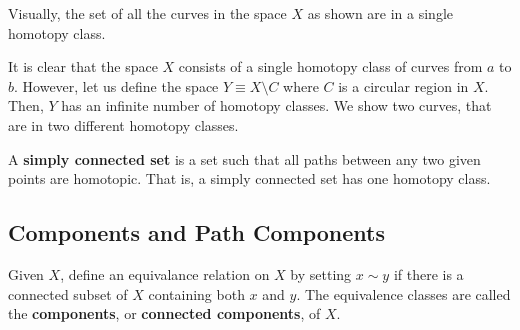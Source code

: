 \documentclass{article}
\begin{document}
    Visually, the set of all the curves in the space $X$ as shown are in a single homotopy class.
    \begin{center}
    \end{center}
    It is clear that the space $X$ consists of a single homotopy class of curves from $a$ to $b$. However, let us define the space $Y \equiv X \setminus C$ where $C$ is a circular region in $X$. Then, $Y$ has an infinite number of homotopy classes. We show two curves, that are in two different homotopy classes. 
    \begin{center}
    \end{center}

    \begin{definition}
    A \textbf{simply connected set} is a set such that all paths between any two given points are homotopic. That is, a simply connected set has one homotopy class. 
    \end{definition}

  \subsection{Components and Path Components}

    \begin{definition}
    Given $X$, define an equivalance relation on $X$ by setting $x \sim y$ if there is a connected subset of $X$ containing both $x$ and $y$. The equivalence classes are called the \textbf{components}, or \textbf{connected components}, of $X$. 
    \end{definition}
\end{document}
